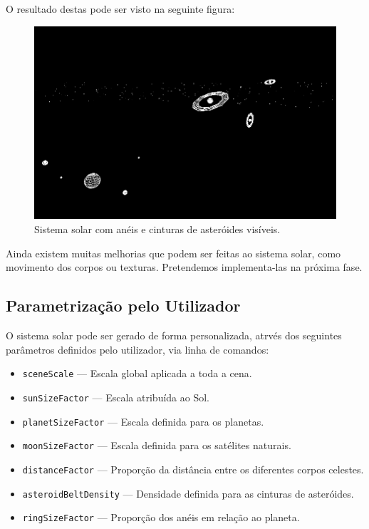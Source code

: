 \documentclass[12pt, a4paper]{article}
\begin{document}
O resultado destas pode ser visto na seguinte figura:

\begin{figure}[H]
    \centering
    \includegraphics[width=0.9\linewidth]{res/phase2/results/SolarSystemOverview.png}
    \caption{Sistema solar com anéis e cinturas de asteróides visíveis.}
\end{figure}

Ainda existem muitas melhorias que podem ser feitas ao sistema solar, como movimento dos corpos
ou texturas.
Pretendemos implementa-las na próxima fase.

\subsection{Parametrização pelo Utilizador}

O sistema solar pode ser gerado de forma personalizada, atrvés dos seguintes parâmetros
definidos
pelo utilizador, via linha de comandos:

\begin{itemize}
    \item \texttt{sceneScale} — Escala global aplicada a toda a cena.
    \item \texttt{sunSizeFactor} — Escala atribuída ao Sol.
    \item \texttt{planetSizeFactor} — Escala definida para os planetas.
    \item \texttt{moonSizeFactor} — Escala definida para os satélites naturais.
    \item \texttt{distanceFactor} — Proporção da distância entre os diferentes corpos
celestes.
    \item \texttt{asteroidBeltDensity} — Densidade definida para as cinturas de asteróides.
    \item \texttt{ringSizeFactor} — Proporção dos anéis em relação ao planeta.
\end{itemize}
\end{document}
